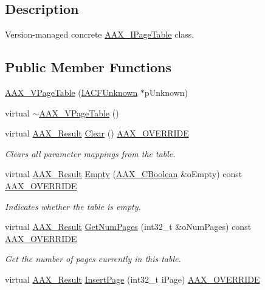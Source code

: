 \subsection{Description}
Version-\/managed concrete \hyperlink{a00107}{A\+A\+X\+\_\+\+I\+Page\+Table} class. \subsection*{Public Member Functions}
\begin{DoxyCompactItemize}
\item 
\hyperlink{a00138_a8a52dc515f5a6975f34ea8dbe0f9059a}{A\+A\+X\+\_\+\+V\+Page\+Table} (\hyperlink{a00146}{I\+A\+C\+F\+Unknown} $\ast$p\+Unknown)
\item 
virtual \hyperlink{a00138_a7d4f7dc580ab1ac9ef75dea848d19a47}{$\sim$\+A\+A\+X\+\_\+\+V\+Page\+Table} ()
\item 
virtual \hyperlink{a00149_a4d8f69a697df7f70c3a8e9b8ee130d2f}{A\+A\+X\+\_\+\+Result} \hyperlink{a00138_af245217ad1a71658b38c7e10b628aef4}{Clear} () \hyperlink{a00149_ac2f24a5172689ae684344abdcce55463}{A\+A\+X\+\_\+\+O\+V\+E\+R\+R\+I\+D\+E}
\begin{DoxyCompactList}\small\item\em Clears all parameter mappings from the table. \end{DoxyCompactList}\item 
virtual \hyperlink{a00149_a4d8f69a697df7f70c3a8e9b8ee130d2f}{A\+A\+X\+\_\+\+Result} \hyperlink{a00138_aa4ea33f7fbe30fcc6b42ec4556ab6afd}{Empty} (\hyperlink{a00149_aa216506530f1d19a2965931ced2b274b}{A\+A\+X\+\_\+\+C\+Boolean} \&o\+Empty) const \hyperlink{a00149_ac2f24a5172689ae684344abdcce55463}{A\+A\+X\+\_\+\+O\+V\+E\+R\+R\+I\+D\+E}
\begin{DoxyCompactList}\small\item\em Indicates whether the table is empty. \end{DoxyCompactList}\item 
virtual \hyperlink{a00149_a4d8f69a697df7f70c3a8e9b8ee130d2f}{A\+A\+X\+\_\+\+Result} \hyperlink{a00138_a2b61ef7d7845388d5adc0533fd541b6f}{Get\+Num\+Pages} (int32\+\_\+t \&o\+Num\+Pages) const \hyperlink{a00149_ac2f24a5172689ae684344abdcce55463}{A\+A\+X\+\_\+\+O\+V\+E\+R\+R\+I\+D\+E}
\begin{DoxyCompactList}\small\item\em Get the number of pages currently in this table. \end{DoxyCompactList}\item 
virtual \hyperlink{a00149_a4d8f69a697df7f70c3a8e9b8ee130d2f}{A\+A\+X\+\_\+\+Result} \hyperlink{a00138_a71e535243a7edc262b18ed3e062bc63e}{Insert\+Page} (int32\+\_\+t i\+Page) \hyperlink{a00149_ac2f24a5172689ae684344abdcce55463}{A\+A\+X\+\_\+\+O\+V\+E\+R\+R\+I\+D\+E}

\end{DoxyCompactItemize}
